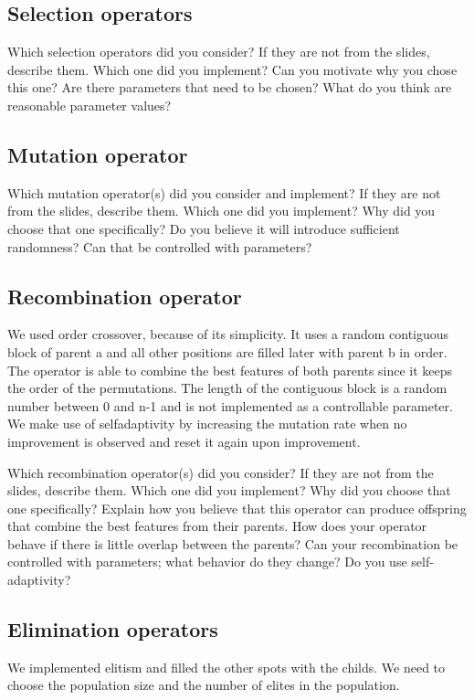 \documentclass[a4paper,10pt]{article}
\newcommand{\ReplaceMe}[1]{{\color{blue}#1}}
\begin{document}
\subsection{Selection operators}

\ReplaceMe{Which selection operators did you consider? If they are not from the slides, describe them. Which one did you implement? Can you motivate why you chose this one? Are there parameters that need to be chosen? What do you think are reasonable parameter values?}

\subsection{Mutation operator}

\ReplaceMe{Which mutation operator(s) did you consider and implement? If they are not from the slides, describe them. Which one did you implement? Why did you choose that one specifically? Do you believe it will introduce sufficient randomness? Can that be controlled with parameters?}

\subsection{Recombination operator}
We used order crossover, because of its simplicity. It uses a random contiguous block of parent a and all other positions are filled later with parent b in order. 
The operator is able to combine the best features of both parents since it keeps the order of the permutations. The length of the contiguous block is a random number between 0 and n-1 and is not implemented as a controllable parameter. We make use of selfadaptivity by increasing the mutation rate when no improvement is observed and reset it again upon improvement.

\ReplaceMe{Which recombination operator(s) did you consider? If they are not from the slides, describe them. Which one did you implement? Why did you choose that one specifically? Explain how you believe that this operator can produce offspring that combine the best features from their parents. How does your operator behave if there is little overlap between the parents? Can your recombination be controlled with parameters; what behavior do they change? Do you use self-adaptivity?}

\subsection{Elimination operators}
We implemented elitism and filled the other spots with the childs. We need to choose the population size and the number of elites in the population.
\end{document}
